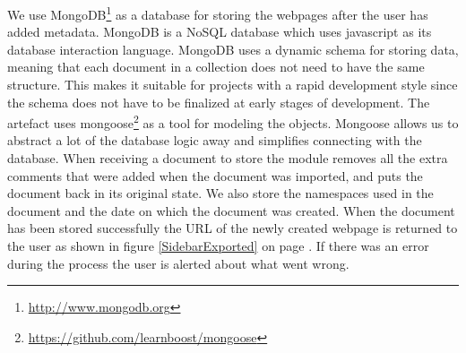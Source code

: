 We use MongoDB\footnote{\url{http://www.mongodb.org}} as a database for storing the webpages after the user has added metadata.
MongoDB is a NoSQL database which uses javascript as its database interaction language.
MongoDB uses a dynamic schema for storing data,
meaning that each document in a collection does not need to have the same structure.
This makes it suitable for projects with a rapid development style since the schema does not have to be
finalized at early stages of development.
The artefact uses mongoose\footnote{\url{https://github.com/learnboost/mongoose}} as a tool for modeling the objects.
Mongoose allows us to abstract a lot of the database logic away and simplifies connecting with the database.
When receiving a document to store the module removes all the extra comments that were added when the document was
imported, and puts the document back in its original state.
We also store the namespaces used in the document and the date on which the document was created.
When the document has been stored successfully the URL of the newly created webpage is returned to the user as shown in
figure \ref{SidebarExported} on page \pageref{SidebarExported}.
If there was an error during the process the user is alerted about what went wrong.
